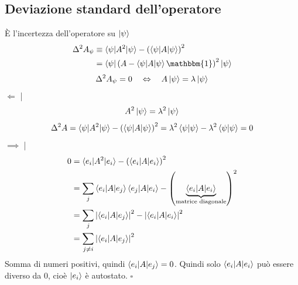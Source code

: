 \subsection{Deviazione standard dell'operatore}
\`E l'incertezza dell'operatore su \(\ket{\psi}\)
\begin{align*}
  \Delta^2 A_\psi
  &\equiv \braket{\psi|A^2|\psi} - \left( \braket{\psi|A|\psi} \right)^2 \\
  &= \braket{\psi|\left( A - \braket{\psi|A|\psi} \mathbbm{1} \right)^2|\psi}
\end{align*}
\[
  \Delta^2 A_\psi = 0
  \quad \Leftrightarrow \quad
  A \ket{\psi} = \lambda \ket{\psi}
\]
\(\Leftarrow\) | 
\[
  A^2 \ket{\psi} = \lambda^2 \ket{\psi}
\]
\[
  \Delta^2 A
  = \braket{\psi|A^2|\psi} - \left( \braket{\psi|A|\psi} \right)^2
  = \lambda^2 \braket{\psi|\psi} - \lambda^2 \braket{\psi|\psi}
  = 0
\]
\(\implies\) |
\begin{align*}
  0
  & = \braket{e_i|A^2|e_i} - \left( \braket{e_i|A|e_i} \right)^2 \\
  & = \sum_j \braket{e_i|A|e_j}\braket{e_j|A|e_i} - \left(
    \underbrace{\braket{e_i|A|e_i}}_{\text{matrice diagonale}}
  \right)^2 \\
  & = \sum_j \left| \braket{e_i|A|e_j} \right|^2
    - \left| \braket{e_i|A|e_i} \right|^2 \\
  & = \sum_{j \ne i} \left| \braket{e_i|A|e_j} \right|^2
\end{align*}
Somma di numeri positivi, quindi \(\braket{e_i|A|e_j} = 0\). Quindi solo
\(\braket{e_i|A|e_i}\) può essere diverso da 0, cioè \(\ket{e_i}\) è autostato.
\(\square\)